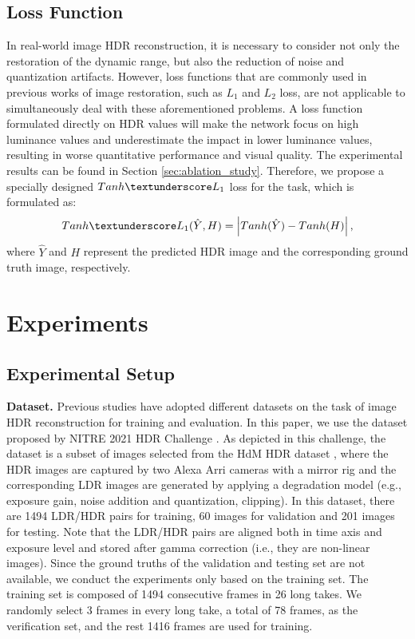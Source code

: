 \documentclass[final]{cvpr}
\begin{document}
\subsection{Loss Function}\label{sec:loss_function}
In real-world image HDR reconstruction, it is necessary to consider not only the restoration of the dynamic range, but also the reduction of noise and quantization artifacts. However, loss functions that are commonly used in previous works of image restoration, such as $L_1$ and $L_2$ loss, are not applicable to simultaneously deal with these aforementioned problems. A loss function formulated directly on HDR values will make the network focus on high luminance values and underestimate the impact in lower luminance values, resulting in worse quantitative performance and visual quality. The experimental results can be found in Section \ref{sec:ablation_study}. Therefore, we propose a specially designed $Tanh \textunderscore L_1$ loss for the task, which is formulated as:
\begin{equation}
	Tanh \textunderscore L_1 (\hat{Y}, H) = \left| Tanh (\hat{Y})-Tanh (H) \right|,
\end{equation} where $\hat{Y}$ and $H$ represent the predicted HDR image and the corresponding ground truth image, respectively.

\section{Experiments}
\subsection{Experimental Setup}\label{sec:experimental_setup}
\textbf{Dataset.} Previous studies \cite{endo2017deep, eilertsen2017hdr, liu2020single, kim2019deep} have adopted different datasets on the task of image HDR reconstruction for training and evaluation. In this paper, we use the dataset proposed by NITRE 2021 HDR Challenge \cite{perez2021ntire}. As depicted in this challenge, the dataset is a subset of images selected from the HdM HDR dataset \cite{froehlich2014creating}, where the HDR images are captured by two Alexa Arri cameras with a mirror rig and the corresponding LDR images are generated by applying a degradation model (e.g., exposure gain, noise addition and quantization, clipping). In this dataset, there are 1494 LDR/HDR pairs for training, 60 images for validation and 201 images for testing. Note that the LDR/HDR pairs are aligned both in time axis and exposure level and stored after gamma correction (i.e., they are non-linear images). Since the ground truths of the validation and testing set are not available, we conduct the experiments only based on the training set. The training set is composed of 1494 consecutive frames in 26 long takes. We randomly select 3 frames in every long take, a total of 78 frames, as the verification set, and the rest 1416 frames are used for training. 
\end{document}
